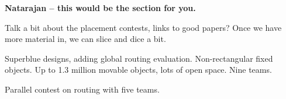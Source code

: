 {\bf Natarajan -- this would be the section for you.}

Talk a bit about the placement contests, links to good papers?
Once we have more material in, we can slice and dice a bit.

Superblue designs, adding global routing evaluation.
Non-rectangular fixed objects.  Up to 1.3 million movable
objects, lots of open space. Nine teams.

Parallel contest on routing with five teams.

